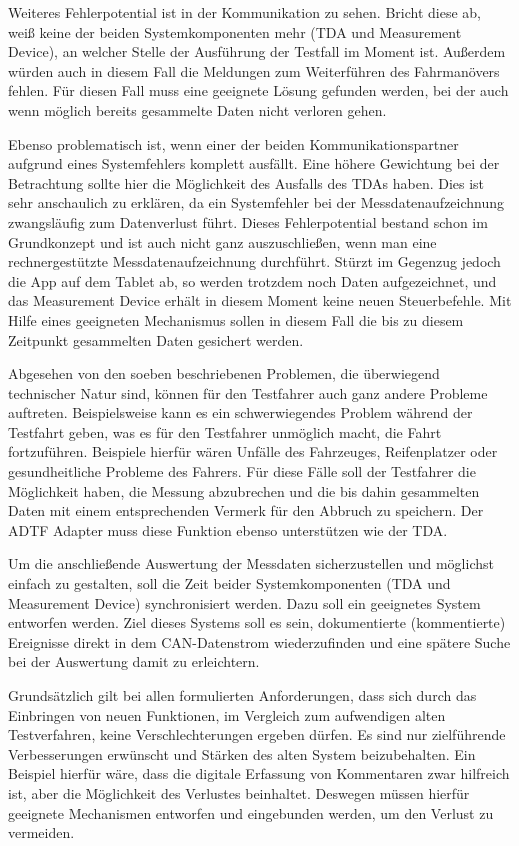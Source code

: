 \documentclass[12pt,a4paper]{report}
\begin{document}
Weiteres Fehlerpotential ist in der Kommunikation zu sehen. Bricht diese ab, weiß keine der beiden Systemkomponenten mehr (TDA und Measurement Device), an welcher Stelle der Ausführung der Testfall im Moment ist. Außerdem würden auch in diesem Fall die Meldungen zum Weiterführen des Fahrmanövers fehlen. Für diesen Fall muss eine geeignete Lösung gefunden werden, bei der auch wenn möglich bereits gesammelte Daten nicht verloren gehen.

Ebenso problematisch ist, wenn einer der beiden Kommunikationspartner aufgrund eines Systemfehlers komplett ausfällt. Eine höhere Gewichtung bei der Betrachtung sollte hier die Möglichkeit des Ausfalls des TDAs haben. Dies ist sehr anschaulich zu erklären, da ein Systemfehler bei der Messdatenaufzeichnung zwangsläufig zum Datenverlust führt. Dieses Fehlerpotential bestand schon im Grundkonzept und ist auch nicht ganz auszuschließen, wenn man eine rechnergestützte Messdatenaufzeichnung durchführt. Stürzt im Gegenzug jedoch die App auf dem Tablet ab, so werden trotzdem noch Daten aufgezeichnet, und das Measurement Device erhält in diesem Moment keine neuen Steuerbefehle. Mit Hilfe eines geeigneten Mechanismus sollen in diesem Fall die bis zu diesem Zeitpunkt gesammelten Daten gesichert werden.

Abgesehen von den soeben beschriebenen Problemen, die überwiegend technischer Natur sind, können für den Testfahrer auch ganz andere Probleme auftreten. Beispielsweise kann es ein schwerwiegendes Problem während der Testfahrt geben, was es für den Testfahrer unmöglich macht, die Fahrt fortzuführen. Beispiele hierfür wären Unfälle des Fahrzeuges, Reifenplatzer oder gesundheitliche Probleme des Fahrers. Für diese Fälle soll der Testfahrer die Möglichkeit haben, die Messung abzubrechen und die bis dahin gesammelten Daten mit einem entsprechenden Vermerk für den Abbruch zu speichern. Der ADTF Adapter muss diese Funktion ebenso unterstützen wie der TDA.

Um die anschließende Auswertung der Messdaten sicherzustellen und möglichst einfach zu gestalten, soll die Zeit beider Systemkomponenten (TDA und Measurement Device) synchronisiert werden. Dazu soll ein geeignetes System entworfen werden. Ziel dieses Systems soll es sein, dokumentierte (kommentierte) Ereignisse direkt in dem CAN-Datenstrom wiederzufinden und eine spätere Suche bei der Auswertung damit zu erleichtern.

Grundsätzlich gilt bei allen formulierten Anforderungen, dass sich durch das Einbringen von neuen Funktionen, im Vergleich zum aufwendigen alten Testverfahren, keine Verschlechterungen ergeben dürfen. Es sind nur zielführende Verbesserungen erwünscht und Stärken des alten System beizubehalten. Ein Beispiel hierfür wäre, dass die digitale Erfassung von Kommentaren zwar hilfreich ist, aber die Möglichkeit des Verlustes beinhaltet. Deswegen müssen hierfür geeignete Mechanismen entworfen und eingebunden werden, um den Verlust zu vermeiden. 
\end{document}
